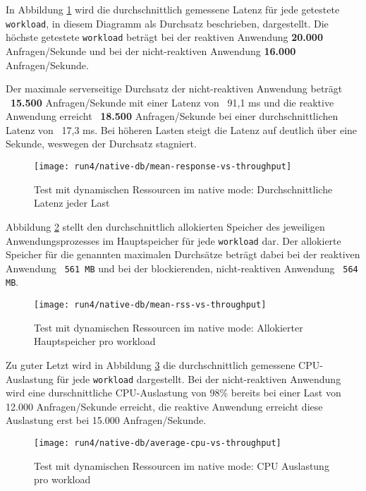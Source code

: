 In Abbildung \ref{fig:native_dynamic_mean_response} wird die durchschnittlich gemessene Latenz für jede getestete \verb|workload|,
in diesem Diagramm als Durchsatz beschrieben, dargestellt.
Die höchste getestete \verb|workload| beträgt bei der reaktiven Anwendung \textbf{20.000} Anfragen/Sekunde und bei der
nicht-reaktiven Anwendung \textbf{16.000} Anfragen/Sekunde.

Der maximale serverseitige Durchsatz der nicht-reaktiven Anwendung beträgt ~\textbf{15.500} Anfragen/Sekunde mit einer
Latenz von ~91,1 ms und
die reaktive Anwendung erreicht ~\textbf{18.500} Anfragen/Sekunde bei einer durchschnittlichen Latenz von ~17,3 ms.
Bei höheren Lasten steigt die Latenz auf deutlich über eine Sekunde, weswegen der Durchsatz stagniert.

\begin{figure}[ht!]
    \centering
    \texttt{[image: run4/native-db/mean-response-vs-throughput]}
    \caption{Test mit dynamischen Ressourcen im native mode: Durchschnittliche Latenz jeder Last}
    \label{fig:native_dynamic_mean_response}
\end{figure}
\newpage
Abbildung \ref{fig:native_dynamic_mean_rss} stellt den durchschnittlich allokierten Speicher des jeweiligen Anwendungsprozesses
im Hauptspeicher für jede \verb|workload| dar. Der allokierte Speicher für die genannten maximalen Durchsätze beträgt dabei bei
der reaktiven Anwendung ~\verb|561 MB| und bei der blockierenden, nicht-reaktiven Anwendung ~\verb|564 MB|.

\begin{figure}[ht!]
    \centering
    \texttt{[image: run4/native-db/mean-rss-vs-throughput]}
    \caption{Test mit dynamischen Ressourcen im native mode: Allokierter Hauptspeicher pro workload}
    \label{fig:native_dynamic_mean_rss}
\end{figure}

Zu guter Letzt wird in Abbildung \ref{fig:native_dynamic_avg_cpu} die durchschnittlich gemessene CPU-Auslastung für jede \verb|workload|
dargestellt. Bei der nicht-reaktiven Anwendung wird eine durschnittliche CPU-Auslastung von 98\% bereits bei einer Last von
12.000 Anfragen/Sekunde erreicht, die reaktive Anwendung erreicht diese Auslastung erst bei 15.000 Anfragen/Sekunde.
\newpage
\begin{figure}[ht!]
    \centering
    \texttt{[image: run4/native-db/average-cpu-vs-throughput]}
    \caption{Test mit dynamischen Ressourcen im native mode: CPU Auslastung pro workload}
    \label{fig:native_dynamic_avg_cpu}
\end{figure}

